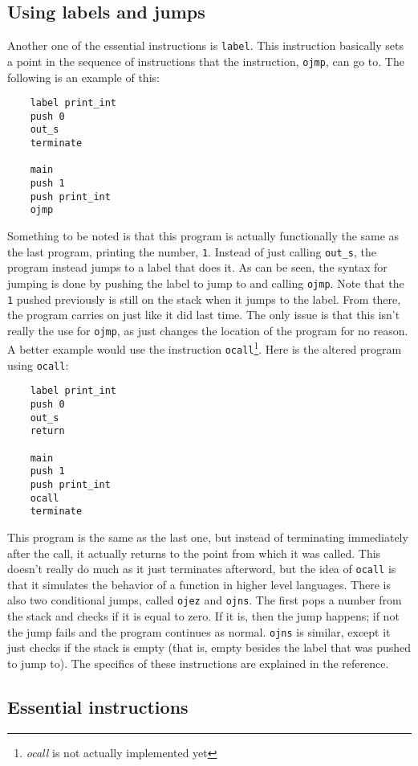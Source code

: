 \documentclass[12pt]{report}
\begin{document}
  \subsection{Using labels and jumps}
  Another one of the essential instructions is \verb|label|.  This instruction basically
  sets a point in the sequence of instructions that the instruction, \verb|ojmp|, can
  go to.  The following is an example of this:
  \begin{verbatim}
	label print_int
	push 0
	out_s
	terminate

	main
	push 1
	push print_int
	ojmp
  \end{verbatim}
  Something to be noted is that this program is actually functionally the same as the
  last program, printing the number, \verb|1|.  Instead of just calling \verb|out_s|,
  the program instead jumps to a label that does it.  As can be seen, the syntax for
  jumping is done by pushing the label to jump to and calling \verb|ojmp|.  Note
  that the \verb|1| pushed previously is still on the stack when it jumps to the label.
  From there, the program carries on just like it did last time.  The only issue is that
  this isn't really the use for \verb|ojmp|, as just changes the location of the program
  for no reason.  A better example would use the instruction \verb|ocall|\footnote{\emph{ocall} is not actually implemented yet}.  Here is the
  altered program using \verb|ocall|:
  \begin{verbatim}
	label print_int
	push 0
	out_s
	return

	main
	push 1
	push print_int
	ocall
	terminate
  \end{verbatim}
  This program is the same as the last one, but instead of terminating immediately after
  the call, it actually returns to the point from which it was called.  This doesn't
  really do much as it just terminates afterword, but the idea of \verb|ocall| is that
  it simulates the behavior of a function in higher level languages.  There is also two
  conditional jumps, called \verb|ojez| and \verb|ojns|.  The first pops a number from
  the stack and checks if it is equal to zero.  If it is, then the jump happens; if not
  the jump fails and the program continues as normal.  \verb|ojns| is similar, except it
  just checks if the stack is empty (that is, empty besides the label that was pushed
  to jump to).  The specifics of these instructions are explained in the reference.
  \subsection{Essential instructions}
  
\end{document}
